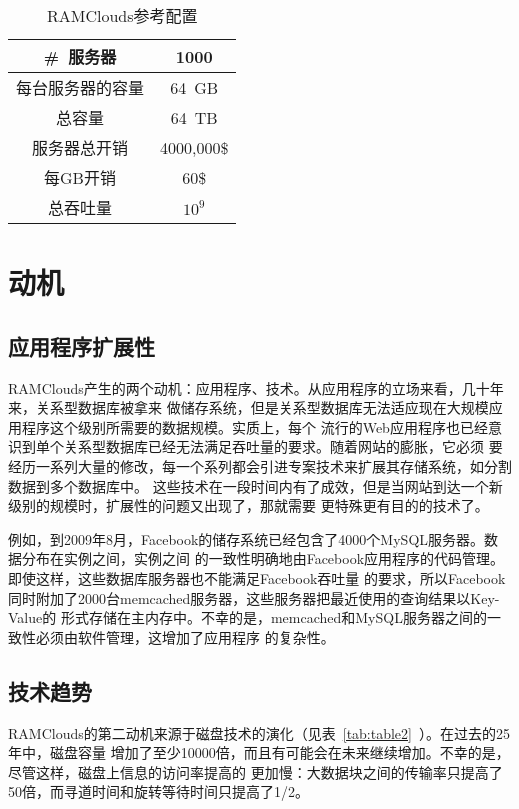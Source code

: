 \documentclass[translation]{zjutreport}
\begin{document}
\begin{table}[htbp]
\caption{RAMClouds参考配置}\label{tab:table1}
\vspace{0.5em}
\begin{center}
{\wuhao
\begin{tabular}{cc}
\toprule[1.5pt]
\#~服务器 & 1000\\
\midrule[1pt]
每台服务器的容量 & 64~GB \\
总容量 & 64~TB \\
服务器总开销 & 4000,000\$ \\
每GB开销 & 60\$ \\
总吞吐量 & $10^{9}$ \\
\bottomrule[1.5pt]
\end{tabular}}
\end{center}
\vspace{\baselineskip}
\end{table}

\chapter{动机}
\section{应用程序扩展性}
RAMClouds产生的两个动机：应用程序、技术。从应用程序的立场来看，几十年来，关系型数据库被拿来
做储存系统，但是关系型数据库无法适应现在大规模应用程序这个级别所需要的数据规模。实质上，每个
流行的Web应用程序也已经意识到单个关系型数据库已经无法满足吞吐量的要求。随着网站的膨胀，它必须
要经历一系列大量的修改，每一个系列都会引进专案技术来扩展其存储系统，如分割数据到多个数据库中。
这些技术在一段时间内有了成效，但是当网站到达一个新级别的规模时，扩展性的问题又出现了，那就需要
更特殊更有目的的技术了。

例如，到2009年8月，Facebook的储存系统已经包含了4000个MySQL服务器。数据分布在实例之间，实例之间
的一致性明确地由Facebook应用程序的代码管理\cite{ref:13}。即使这样，这些数据库服务器也不能满足Facebook吞吐量
的要求，所以Facebook同时附加了2000台memcached服务器，这些服务器把最近使用的查询结果以Key-Value的
形式存储在主内存中。不幸的是，memcached和MySQL服务器之间的一致性必须由软件管理，这增加了应用程序
的复杂性。

\section{技术趋势}
RAMClouds的第二动机来源于磁盘技术的演化（见表~\ref{tab:table2}~）。在过去的25年中，磁盘容量
增加了至少10000倍，而且有可能会在未来继续增加。不幸的是，尽管这样，磁盘上信息的访问率提高的
更加慢：大数据块之间的传输率只提高了50倍，而寻道时间和旋转等待时间只提高了1/2。
\end{document}

